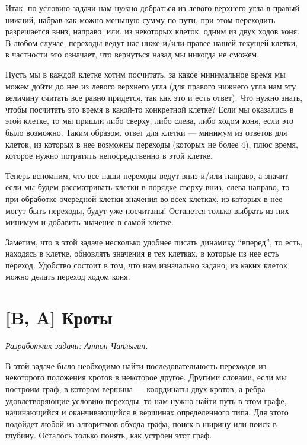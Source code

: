 \documentclass[12pt]{article}
\theoremstyle{definition}
\begin{document}
Итак, по условию задачи нам нужно добраться из левого верхнего угла в правый нижний, набрав как можно меньшую сумму по пути,
при этом переходить разрешается вниз, направо, или, из некоторых клеток, одним из двух ходов коня. В любом случае, переходы
ведут нас ниже и/или правее нашей текущей клетки, в частности это означает, что вернуться назад мы никогда не сможем.

Пусть мы в каждой клетке хотим посчитать, за какое
минимальное время мы можем дойти до нее из левого верхнего угла (для правого нижнего угла нам эту величину считать все равно
придется, так как это и есть ответ). Что нужно знать, чтобы
посчитать это время в какой-то конкретной клетке?
Если мы оказались в этой клетке, то мы пришли либо сверху, либо слева, либо ходом коня, если это было возможно. Таким образом, ответ для клетки --- минимум из ответов для клеток, из которых в нее возможны переходы (которых не более 4), плюс время, которое нужно потратить непосредственно в этой клетке.

Теперь вспомним, что все наши переходы ведут вниз и/или направо, а значит если мы будем рассматривать клетки в порядке
сверху вниз, слева направо, то при обработке очередной клетки
значения во всех клетках, из которых в нее могут быть переходы, будут уже посчитаны! Останется только выбрать из них минимум и добавить значение в самой клетке.

Заметим, что в этой задаче несколько удобнее писать динамику ``вперед'', то есть, находясь в клетке, обновлять значения
в тех клетках, в которые из нее есть переход. Удобство состоит
в том, что нам изначально задано, из каких
клеток можно делать переход ходом коня.

\section{[B, A] Кроты}
\textit{Разработчик задачи: Антон Чаплыгин.}

В этой задаче было необходимо найти последовательность переходов из некоторого положения
кротов в некоторое другое. Другими словами, если мы построим граф, в котором вершина ---
координаты двух кротов, а ребра --- удовлетворяющие условию переходы, то нам нужно найти путь
в этом графе, начинающийся и оканчивающийся в вершинах определенного типа. Для этого
подойдет любой из алгоритмов обхода графа, поиск в ширину или поиск в глубину. Осталось
только понять, как устроен этот граф.
\end{document}
